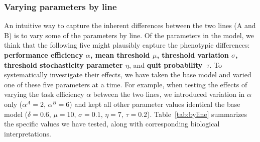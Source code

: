 \documentclass[11pt]{article}
\begin{document}
\subsubsection{Varying parameters by line} 

An intuitive way to capture the inherent differences between the two lines (A and B) is to vary some of the parameters by line. Of the parameters in the model, we think that the following five might plausibly capture the phenotypic differences: \textbf{ performance efficiency $\alpha$, mean threshold $\mu$, threshold variation $\sigma$, threshold stochasticity parameter $\eta$}, and \textbf{quit probability~$\tau$}. To systematically investigate their effects, we have taken the base model and varied one of these five parameters at a time. For example, when testing the effects of varying the task efficiency $\alpha$ between the two lines, we introduced variation in $\alpha$ only ($\alpha^A = 2$, $\alpha^B = 6$) and kept all other parameter values identical the base model ($\delta = 0.6$, $\mu = 10$, $\sigma = 0.1$, $\eta = 7$, $\tau = 0.2$). Table~\ref{tab:byline} summarizes the specific values we have tested, along with corresponding biological interpretations.
\end{document}
